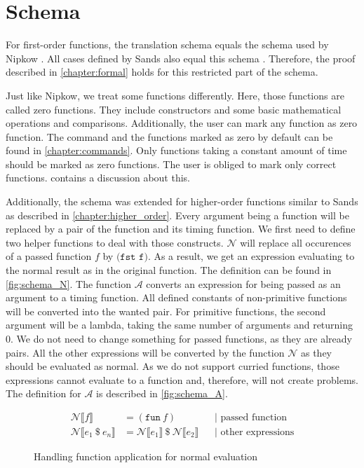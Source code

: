 
\section{Schema} \label{chapter:impl_schema}
For first-order functions, the translation schema equals the schema used by Nipkow \parencite{fds}.
All cases defined by Sands also equal this schema \parencite{sands}.
Therefore, the proof described in \autoref{chapter:formal} holds for this restricted part of the schema.

Just like Nipkow, we treat some functions differently.
Here, those functions are called zero functions.
They include constructors and some basic mathematical operations and comparisons.
Additionally, the user can mark any function as zero function.
The command and the functions marked as zero by default can be found in \autoref{chapter:commands}.
Only functions taking a constant amount of time should be marked as zero functions.
The user is obliged to mark only correct functions.
 contains a discussion about this.

Additionally, the schema was extended for higher-order functions similar to Sands as described in \autoref{chapter:higher_order}.
Every argument being a function will be replaced by a pair of the function and its timing function.
We first need to define two helper functions to deal with those constructs.
$\mathcal{N}$ will replace all occurences of a passed function $f$ by $\texttt{(fst f)}$.
As a result, we get an expression evaluating to the normal result as in the original function.
The definition can be found in \autoref{fig:schema_N}.
The function $\mathcal{A}$ converts an expression for being passed as an argument to a timing function.
All defined constants of non-primitive functions will be converted into the wanted pair.
For primitive functions, the second argument will be a lambda, taking the same number of arguments and returning $0$.
We do not need to change something for passed functions, as they are already pairs.
All the other expressions will be converted by the function $\mathcal{N}$ as they should be evaluated as normal.
As we do not support curried functions, those expressions cannot evaluate to a function and, therefore, will not create problems.
The definition for $\mathcal{A}$ is described in \autoref{fig:schema_A}.
\begin{figure}
\begin{align*}
  \mathcal{N}\llbracket f\rrbracket &= (\texttt{fun}\ f) &&\text{| passed function}\\
  \mathcal{N}\llbracket e_{1}\ \$\ e_{n}\rrbracket &= \mathcal{N}\llbracket e_{1}\rrbracket\ \$\ \mathcal{N}\llbracket e_{2}\rrbracket &&\text{| other expressions}
\end{align*}
\caption{Handling function application for normal evaluation}
\label{fig:schema_N}
\end{figure}

